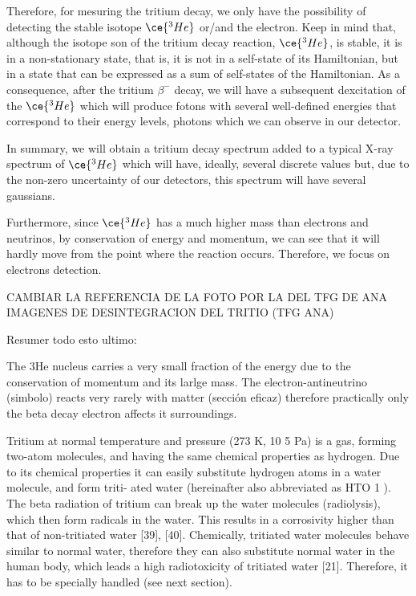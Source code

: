 Therefore, for mesuring the tritium decay, we only have the possibility of detecting the stable isotope $\ce{^{3}He}$ or/and the electron. Keep in mind that, although the isotope son of the tritium decay reaction, $\ce{^{3}He}$, is stable, it is in a non-stationary state, that is, it is not in a self-state of its Hamiltonian, but in a state that can be expressed as a sum of self-states of the Hamiltonian. As a consequence, after the tritium $\beta^-$ decay, we will have a subsequent dexcitation of the $\ce{^{3}He}$ which will produce fotons with several well-defined energies that correspond to their energy levels, photons which we can observe in our detector.

In summary, we will obtain a tritium decay spectrum added to a typical X-ray spectrum of $\ce{^{3}He}$ which will have, ideally, several discrete values but, due to the non-zero uncertainty of our detectors, this spectrum will have several gaussians.

Furthermore, since $\ce{^{3}He}$ has a much higher mass than electrons and neutrinos, by conservation of energy and momentum, we can see that it will hardly move from the point where the reaction occurs. Therefore, we focus on electrons detection.



CAMBIAR LA REFERENCIA DE LA FOTO POR LA DEL TFG DE ANA
IMAGENES DE DESINTEGRACION DEL TRITIO (TFG ANA)

Resumer todo esto ultimo:

The 3He nucleus carries a very small fraction of the energy due to the conservation of momentum and its larlge mass. The electron-antineutrino (simbolo) reacts very rarely with matter (sección eficaz) therefore practically only the beta decay electron affects it surroundings. 

Tritium at normal temperature and pressure (273 K, 10 5 Pa) is a gas, forming two-atom
molecules, and having the same chemical properties as hydrogen. Due to its chemical
properties it can easily substitute hydrogen atoms in a water molecule, and form triti-
ated water (hereinafter also abbreviated as HTO 1 ). The beta radiation of tritium can
break up the water molecules (radiolysis), which then form radicals in the water. This
results in a corrosivity higher than that of non-tritiated water [39], [40].
Chemically, tritiated water molecules behave similar to normal water, therefore they
can also substitute normal water in the human body, which leads a high radiotoxicity of
tritiated water [21]. Therefore, it has to be specially handled (see next section).

